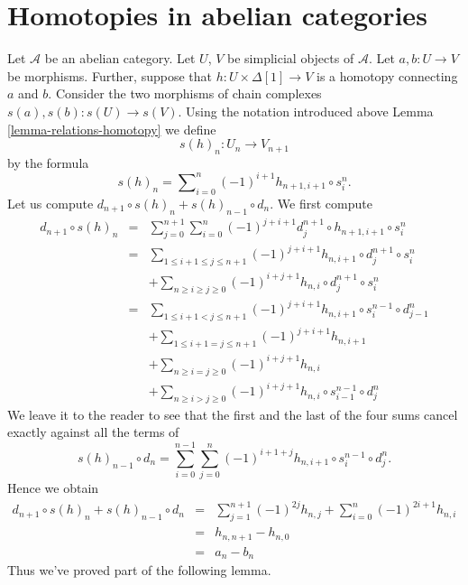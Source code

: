 \section{Homotopies in abelian categories}
\label{section-homotopy-abelian}

\noindent
Let $\mathcal{A}$ be an abelian category.
Let $U$, $V$ be simplicial objects of $\mathcal{A}$.
Let $a, b : U \to V$ be morphisms. Further, suppose
that $h : U \times \Delta[1] \to V$ is a homotopy
connecting $a$ and $b$. Consider the two morphisms
of chain complexes
$s(a), s(b) : s(U) \longrightarrow s(V)$.
Using the notation introduced above Lemma \ref{lemma-relations-homotopy}
we define
$$
s(h)_n : U_n \longrightarrow V_{n + 1}
$$
by the formula
\begin{equation}
\label{equation-homotopy-to-homotopy}
s(h)_n = \sum\nolimits_{i = 0}^n (-1)^{i + 1} h_{n + 1, i + 1} \circ s^n_i.
\end{equation}
Let us compute $d_{n + 1} \circ s(h)_n + s(h)_{n - 1} \circ d_n$.
We first compute
\begin{eqnarray*}
d_{n + 1} \circ s(h)_n & = &
\sum\nolimits_{j = 0}^{n + 1}
\sum\nolimits_{i = 0}^n
(-1)^{j + i + 1}
d^{n + 1}_j \circ h_{n + 1, i + 1} \circ s^n_i \\
& = &
\sum\nolimits_{1 \leq i + 1 \leq j \leq n + 1}
(-1)^{j + i + 1}
h_{n, i + 1} \circ d^{n + 1}_j \circ s^n_i \\
& &
+
\sum\nolimits_{n \geq i \geq j \geq 0}
(-1)^{i + j + 1}
h_{n, i} \circ d^{n + 1}_j \circ s^n_i \\
& = &
\sum\nolimits_{1 \leq i + 1 < j \leq n + 1}
(-1)^{j + i + 1}
h_{n, i + 1} \circ s^{n - 1}_i \circ d^n_{j - 1} \\
& &
+
\sum\nolimits_{1 \leq i + 1 = j \leq n + 1}
(-1)^{j + i + 1}
h_{n, i + 1} \\
& &
+
\sum\nolimits_{n \geq i = j \geq 0}
(-1)^{i + j + 1}
h_{n, i} \\
& &
+
\sum\nolimits_{n \geq i > j \geq 0}
(-1)^{i + j + 1}
h_{n, i} \circ s^{n - 1}_{i - 1} \circ d^n_j
\end{eqnarray*}
We leave it to the reader to see that the first and the last
of the four sums cancel exactly against all the terms of
$$
s(h)_{n - 1} \circ d_n
=
\sum_{i = 0}^{n - 1} \sum_{j = 0}^n
(-1)^{i + 1 + j} h_{n, i + 1} \circ s^{n - 1}_i \circ d^n_j.
$$
Hence we obtain
\begin{eqnarray*}
d_{n + 1} \circ s(h)_n + s(h)_{n - 1} \circ d_n
& = &
\sum_{j = 1}^{n + 1} (-1)^{2j} h_{n, j}
+
\sum_{i = 0}^n (-1)^{2i + 1} h_{n, i} \\
& = &
h_{n, n + 1} - h_{n , 0} \\
& = &
a_n - b_n
\end{eqnarray*}
Thus we've proved part of the following lemma.

